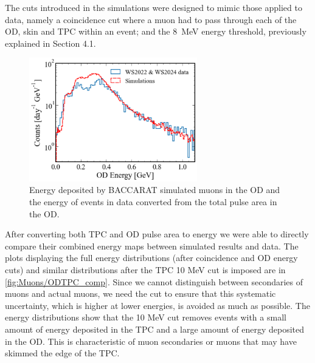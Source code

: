 The cuts introduced in the simulations were designed to mimic those applied to data, namely a coincidence cut where a muon had to pass through each of the OD, skin and TPC within an event; and the 8~MeV energy threshold, previously explained in Section 4.1. \\

\begin{figure}[htbp]
    \centering
    \includegraphics[width=0.65\textwidth]{figures/Muons/OD_comparison.pdf}
    \caption{Energy deposited by BACCARAT simulated muons in the OD and the energy of events in data converted from the total pulse area in the OD.}
    \label{fig:Muons/OD_comp}
\end{figure}
\par After converting both TPC and OD pulse area to energy we were able to directly compare their combined energy maps between simulated results and data. The plots displaying the full energy distributions (after coincidence and OD energy cuts) and similar distributions after the TPC 10 MeV cut is imposed are in \autoref{fig:Muons/ODTPC_comp}. Since we cannot distinguish between secondaries of muons and actual muons, we need the cut to ensure that this systematic uncertainty, which is higher at lower energies, is avoided as much as possible. The energy distributions show that the 10 MeV cut removes events with a small amount of energy deposited in the TPC and a large amount of energy deposited in the OD. This is characteristic of muon secondaries or muons that may have skimmed the edge of the TPC. 

